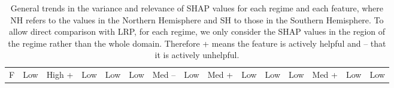 \documentclass[a4paper]{article}
\begin{document}
\begin{table}[H]
\begin{tabular}{l|cccccccccccccc}
F                           & {\color[HTML]{FE0000} Low} & \multicolumn{1}{c|}{{\color[HTML]{010066} High +}} & {\color[HTML]{FE0000} Low} & \multicolumn{1}{c|}{{\color[HTML]{009901} Low}}                                                              & {\color[HTML]{FE0000} Low} & \multicolumn{1}{c|}{{Med --}}                                                           & {\color[HTML]{FE0000} Low} & \multicolumn{1}{c|}{{Med +}}  & {\color[HTML]{FE0000} Low}     & \multicolumn{1}{c|}{{\color[HTML]{009901} Low}}    & {\color[HTML]{FE0000} Low}            & \multicolumn{1}{c|}{{Med +}}            & {\color[HTML]{FE0000} Low}                       & {\color[HTML]{009901} Low}                      
\end{tabular}
\caption{General trends in the variance and relevance of SHAP values for each regime and each feature, where NH refers to the values in the Northern Hemisphere and SH to those in the Southern Hemisphere. To allow direct comparison with LRP, for each regime, we only consider the SHAP values in the region of the regime rather than the whole domain. Therefore + means the feature is actively helpful and -- that it is actively unhelpful.}\label{table:shap_summary}
\end{table}
\end{document}
